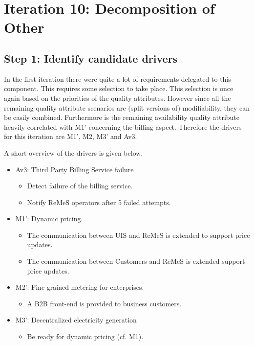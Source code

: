 \section{Iteration 10: Decomposition of Other}
\label{add:it10}

\subsection{Step 1: Identify candidate drivers}
\label{add:it10/drivers}

\npar In the first iteration there were quite a lot of requirements delegated to
this component. This requires some selection to take place. This selection is
once again based on the priorities of the quality attributes. However since all
the remaining quality attribute scenarios are (split versions of)
modifiability, they can be easily combined. Furthermore is the remaining
availability quality attribute heavily correlated with M1' concerning the
billing aspect. Therefore the drivers for this iteration are M1', M2, M3' and
Av3.

\npar A short overview of the drivers is given below.

\begin{itemize}
	\item Av3: Third Party Billing Service failure
	\begin{itemize}
		\item Detect failure of the billing service.
		\item Notify ReMeS operators after 5 failed attempts.
	\end{itemize}
 	\item M1': Dynamic pricing.
  	\begin{itemize}
    	\item The communication between UIS and ReMeS is extended to support price
    	updates.
    	\item The communication between Customers and ReMeS is extended support
    	price updates.
  	\end{itemize}
  	\item M2': Fine-grained metering for enterprises.
  	\begin{itemize}
  	  \item A B2B front-end is provided to business customers.
  	\end{itemize}
	\item M3': Decentralized electricity generation
  	\begin{itemize}
  	  \item Be ready for dynamic pricing (cf. M1).
  	\end{itemize}
\end{itemize}

